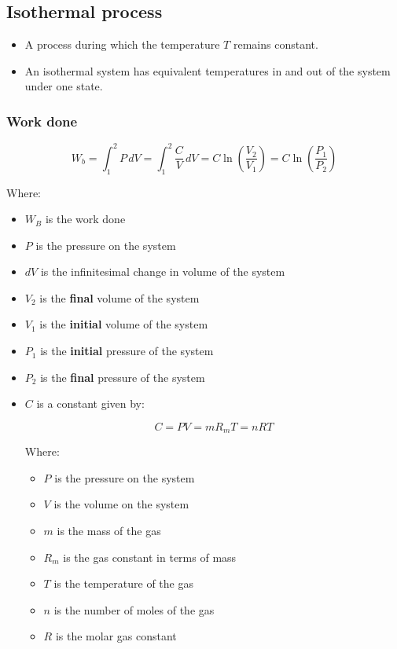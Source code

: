 \documentclass[11pt]{article}
\begin{document}
\subsection{Isothermal process}
\label{sec:org1b20a7e}
\begin{itemize}
\item A process during which the temperature \(T\) remains constant.
\item An isothermal system has equivalent temperatures in and out of the system under one state.
\end{itemize}
\subsubsection{Work done}
\label{sec:org922f1bc}
\[W_b = \int_1^2 P \, dV = \int_1^2 \frac{C}{V} \, dV = C \ln \left(\frac{V_2}{V_1} \right) = C \ln \left(\frac{P_1}{P_2} \right)\]

Where:
\begin{itemize}
\item \(W_B\) is the work done
\item \(P\) is the pressure on the system
\item \(dV\) is the infinitesimal change in volume of the system
\item \(V_2\) is the \textbf{final} volume of the system
\item \(V_1\) is the \textbf{initial} volume of the system
\item \(P_1\) is the \textbf{initial} pressure of the system
\item \(P_2\) is the \textbf{final} pressure of the system
\item \(C\) is a constant given by:

\[C = PV = m R_m T = nRT\]

Where:
\begin{itemize}
\item \(P\) is the pressure on the system
\item \(V\) is the volume on the system
\item \(m\) is the mass of the gas
\item \(R_m\) is the gas constant in terms of mass
\item \(T\) is the temperature of the gas
\item \(n\) is the number of moles of the gas
\item \(R\) is the molar gas constant
\end{itemize}
\end{itemize}
\end{document}
